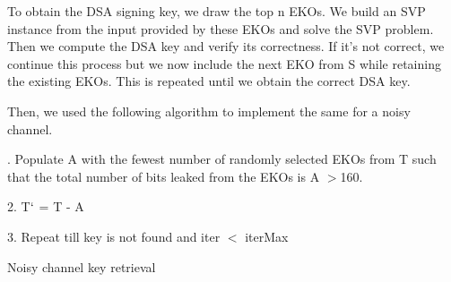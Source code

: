 \documentclass[11pt]{article}
\begin{document}
\medskip


\medskip


\medskip


\medskip

To obtain the DSA signing key, we draw the top n EKOs. We build an SVP instance
from the input provided by these EKOs and solve the SVP problem. Then we compute the
DSA key and verify its correctness. If it's not correct, we continue this process but we now
include the next EKO from S while retaining the existing EKOs. This is repeated
until we obtain the correct DSA key.

\pagebreak

Then, we used the following algorithm to implement the same for a noisy channel. \\

\begin{algorithm}[H]
. Populate A with the fewest number of randomly selected EKOs from T such that the total number of bits leaked from the EKOs is A $>$160.

2. T$`$ = T - A

3. Repeat till key is not found and iter $<$ iterMax\\


\medskip


 \caption{Noisy channel key retrieval}
\end{algorithm}
\end{document}
